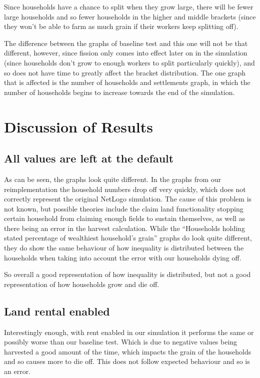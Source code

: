 \documentclass[12pt]{article}
\begin{document}
				Since households have a chance to split when they grow large, there will be fewer large households and so fewer households in the higher and middle brackets (since they won’t be able to farm as much grain if their workers keep splitting off). 
			
				The difference between the graphs of baseline test and this one will not be that different, however, since fission only comes into effect later on in the simulation (since households don’t grow to enough workers to split particularly quickly), and so does not have time to greatly affect the bracket distribution. The one graph that is affected is the number of households and settlements graph, in which the number of households begins to increase towards the end of the simulation.
		\section{Discussion of Results}
		
			\subsection{All values are left at the default}
				As can be seen, the graphs look quite different. In the graphs from our reimplementation the household numbers drop off very quickly, which does not correctly represent the original NetLogo simulation. The cause of this problem is not known, but possible theories include the claim land functionality stopping certain household from claiming enough fields to sustain themselves, as well as there being an error in the harvest calculation. 
				While the “Households holding stated percentage of wealthiest household’s grain” graphs do look quite different, they do show the same behaviour of how inequality is distributed between the households when taking into account the error with our households dying off.
		
				So overall a good representation of how inequality is distributed, but not a good representation of how households grow and die off.
		
			\subsection{Land rental enabled}
				Interestingly enough, with rent enabled in our simulation it performs the same or possibly worse than our baseline test. Which is due to negative values being harvested a good amount of the time, which impacts the grain of the households and so causes more to die off. This does not follow expected behaviour and so is an error.
		
\end{document}
